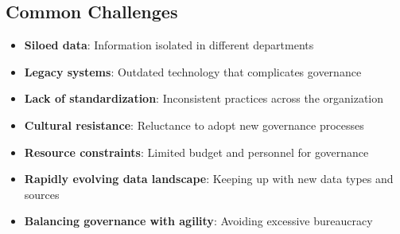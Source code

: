 \documentclass[12pt]{article}
\begin{document}
\subsection{Common Challenges}
\begin{itemize}
    \item \textbf{Siloed data}: Information isolated in different departments
    \item \textbf{Legacy systems}: Outdated technology that complicates governance
    \item \textbf{Lack of standardization}: Inconsistent practices across the organization
    \item \textbf{Cultural resistance}: Reluctance to adopt new governance processes
    \item \textbf{Resource constraints}: Limited budget and personnel for governance
    \item \textbf{Rapidly evolving data landscape}: Keeping up with new data types and sources
    \item \textbf{Balancing governance with agility}: Avoiding excessive bureaucracy
\end{itemize}
\end{document}

